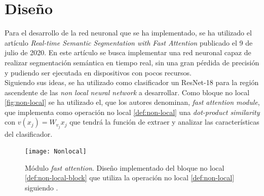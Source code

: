 


\chapter{Diseño}

Para el desarrollo de la red neuronal que se ha implementado, se ha utilizado el artículo \emph{Real-time Semantic Segmentation with Fast Attention} \cite{2020arXiv200703815H} publicado el 9 de julio de 2020. En este artículo se busca implementar una red neuronal capaz de realizar segmentación semántica en tiempo real, sin una gran pérdida de precisión y pudiendo ser ejecutada en dispositivos con pocos recursos.\\

Siguiendo sus ideas, se ha utilizado como clasificador un ResNet-18 \cite{DBLP:journals/corr/HeZRS15} para la región ascendente de las \emph{non local neural network} a desarrollar. Como bloque no local \autoref{fig:non-local} se ha utilizado el, que los autores denominan, \emph{fast attention module}, que implementa como operación no local \autoref{def:non-local} una \emph{dot-product similarity} con $v(x_j)=W_{v_j}x_j$ que tendrá la función de extraer y analizar las características del clasificador. \\

\begin{figure}[h]
  \centering
  \texttt{[image: Nonlocal]}
  \caption{Módulo \emph{fast attention}. Diseño implementado del bloque no local \autoref{def:non-local-block} que utiliza la operación no local \autoref{def:non-local} siguiendo \cite{2020arXiv200703815H}.}
  \label{fig:non-local}
\end{figure}

